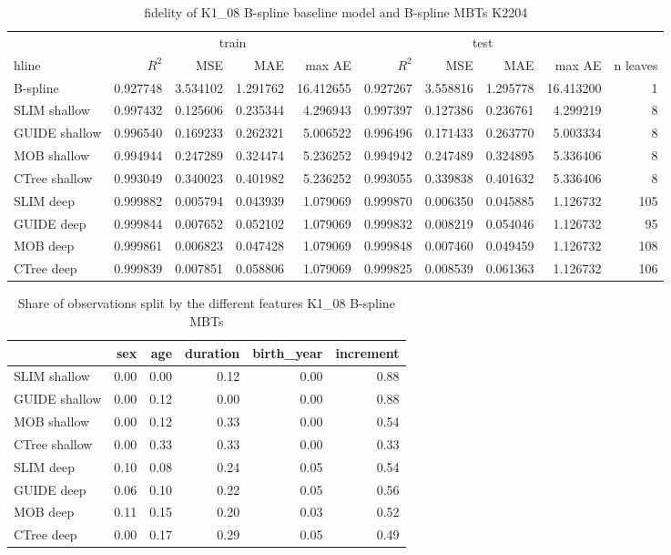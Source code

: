\begin{table}[!htb]

\centering \scriptsize
\begin{tabular}[t]{l|r|r|r|r|r|r|r|r|r}
\hline
& \multicolumn{4}{|c|}{train} & \multicolumn{4}{|c|}{test} & \\
hline
 & $R^2$ & MSE & MAE & max AE & $R^2$ & MSE & MAE & max AE & n leaves\\
\hline

B-spline & 0.927748 & 3.534102 & 1.291762 & 16.412655 & 0.927267 & 3.558816 & 1.295778 & 16.413200 & 1\\
\hline
SLIM shallow & 0.997432 & 0.125606 & 0.235344 & 4.296943 & 0.997397 & 0.127386 & 0.236761 & 4.299219 & 8\\
GUIDE shallow & 0.996540 & 0.169233 & 0.262321 & 5.006522 & 0.996496 & 0.171433 & 0.263770 & 5.003334 & 8\\
MOB shallow & 0.994944 & 0.247289 & 0.324474 & 5.236252 & 0.994942 & 0.247489 & 0.324895 & 5.336406 & 8\\
CTree shallow & 0.993049 & 0.340023 & 0.401982 & 5.236252 & 0.993055 & 0.339838 & 0.401632 & 5.336406 & 8\\
\hline
SLIM deep & 0.999882 & 0.005794 & 0.043939 & 1.079069 & 0.999870 & 0.006350 & 0.045885 & 1.126732 & 105\\
GUIDE deep & 0.999844 & 0.007652 & 0.052102 & 1.079069 & 0.999832 & 0.008219 & 0.054046 & 1.126732 & 95\\
MOB deep & 0.999861 & 0.006823 & 0.047428 & 1.079069 & 0.999848 & 0.007460 & 0.049459 & 1.126732 & 108\\
CTree deep & 0.999839 & 0.007851 & 0.058806 & 1.079069 & 0.999825 & 0.008539 & 0.061363 & 1.126732 & 106\\
\hline
\end{tabular}
\caption{fidelity of K1\_08 B-spline baseline model and  B-spline MBTs K2204}
\label{tab:ins_k108_bsplines_surrogates_perf}
\end{table}




\begin{table}[!htb]
\centering \scriptsize
\begin{tabular}[t]{l|r|r|r|r|r}
\hline
  & sex & age & duration & birth\_year & increment\\
\hline
SLIM shallow & 0.00 & 0.00 & 0.12 & 0.00  & 0.88\\
GUIDE shallow & 0.00 & 0.12 & 0.00 & 0.00  & 0.88\\
MOB shallow & 0.00 & 0.12 & 0.33 & 0.00  & 0.54\\
CTree shallow & 0.00 & 0.33 & 0.33 & 0.00  & 0.33\\
\hline
SLIM deep & 0.10 & 0.08 & 0.24 & 0.05 & 0.54\\
GUIDE deep & 0.06 & 0.10 & 0.22 & 0.05 & 0.56\\
MOB deep & 0.11 & 0.15 & 0.20 & 0.03 & 0.52\\
CTree deep & 0.00 & 0.17 & 0.29 & 0.05 & 0.49\\
\hline
\end{tabular}
\caption{Share of observations split by the different features K1\_08 B-spline MBTs}
\label{tab:ins_k108_share}
\end{table}

